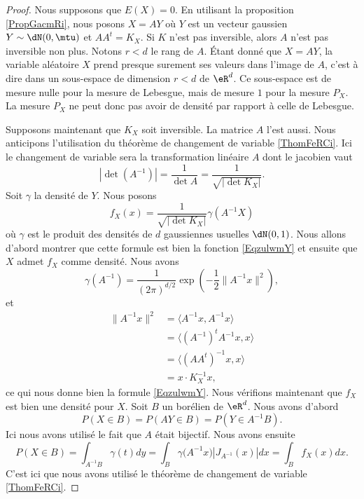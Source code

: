 \begin{proof}
    Nous supposons que \( E(X)=0\). En utilisant la proposition \ref{PropGacmRi}, nous posons \( X=AY\) où \( Y\) est un vecteur gaussien \( Y\sim\dN(0,\mtu)\) et \( AA^t=K_X\). Si \( K\) n'est pas inversible, alors \( A\) n'est pas inversible non plus. Notons \( r<d\) le rang de \( A\). Étant donné que \( X=AY\), la variable aléatoire \( X\) prend presque surement ses valeurs dans l'image de \( A\), c'est à dire dans un sous-espace de dimension \( r<d\) de \( \eR^d\). Ce sous-espace est de mesure nulle pour la mesure de Lebesgue, mais de mesure \( 1\) pour la mesure \( P_X\). La mesure \( P_X\) ne peut donc pas avoir de densité par rapport à celle de Lebesgue.

    Supposons maintenant que \( K_X\) soit inversible. La matrice \( A\) l'est aussi. Nous anticipons l'utilisation du théorème de changement de variable \ref{ThomFeRCi}. Ici le changement de variable sera la transformation linéaire \( A\) dont le jacobien vaut
    \begin{equation}
        | \det(A^{-1}) |=\frac{1}{ \det A }=\frac{1}{ \sqrt{| \det K_X |} }.
    \end{equation}
    Soit \( \gamma\) la densité de \( Y\). Nous posons
    \begin{equation}
        f_X(x)=\frac{1}{\sqrt{| \det K_X |}} \gamma(A^{-1} X)
    \end{equation}
    où \( \gamma\) est le produit des densités de \( d\) gaussiennes usuelles \( \dN(0,1)\). Nous allons d'abord montrer que cette formule est bien la fonction \eqref{EqzulwmY} et ensuite que \( X\) admet \( f_X\) comme densité. Nous avons
    \begin{equation}
        \gamma(A^{-1})=\frac{1}{ (2\pi)^{d/2} }\exp\left( -\frac{ 1 }{2}\| A^{-1}x \|^2 \right),
    \end{equation}
    et 
    \begin{subequations}
        \begin{align}
            \| A^{-1}x \|^2&=\langle A^{-1}x, A^{-1}x\rangle \\
            &=\langle (A^{-1})^tA^{-1}x, x\rangle \\
            &=\langle (AA^t)^{-1}x, x\rangle \\
            &=x\cdot K_X^{-1}x,
        \end{align}
    \end{subequations}
    ce qui nous donne bien la formule \eqref{EqzulwmY}. Nous vérifions maintenant que \( f_X\) est bien une densité pour \( X\). Soit \( B\) un borélien de \( \eR^d\). Nous avons d'abord
    \begin{equation}
        P(X\in B)=P(AY\in B)=P(Y\in A^{-1}B).
    \end{equation}
    Ici nous avons utilisé le fait que \( A\) était bijectif. Nous avons ensuite
    \begin{equation}
            P(X\in B)=\int_{A^{-1}B}\gamma(t)dy
            =\int_B\gamma\big( A^{-1}x \big)| J_{A^{-1}}(x) |dx
            =\int_Bf_X(x)dx.
    \end{equation}
    C'est ici que nous avons utilisé le théorème de changement de variable \ref{ThomFeRCi}.
\end{proof}

